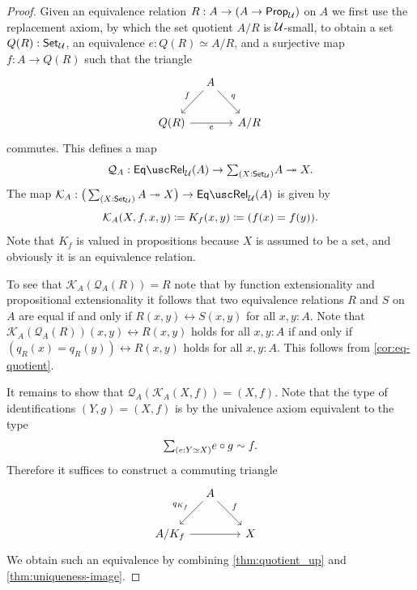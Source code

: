 \begin{proof}
  Given an equivalence relation $R:A\to(A\to\mathsf{Prop}_{\mathcal{U}})$ on $A$ we first use the replacement axiom, by which the set quotient $A/R$ is $\mathcal{U}$-small, to obtain a set $Q(R):\mathsf{Set}_{\mathcal{U}}$, an equivalence $e:Q(R)\simeq A/R$, and a surjective map $f:A\to Q(R)$ such that the triangle
  \begin{equation*}
    \begin{tikzcd}[column sep=1em]
      \phantom{Q(R)} & A \arrow[dl,swap,"f"] \arrow[dr,"q"] & \phantom{Q(R)}\\
      Q(R) \arrow[rr,swap,"e"] & & A/R
    \end{tikzcd}
  \end{equation*}
  commutes. This defines a map
  \begin{equation*}
    \mathcal{Q}_A:\eqrel_\UU(A)\to\sm{X:\Set_\UU}A\twoheadrightarrow X.
  \end{equation*}
  The map $\mathcal{K}_A:\big(\sm{X:\Set_\UU}A\twoheadrightarrow X\big)\to\eqrel_\UU(A)$ is given by
  \begin{equation*}
    \mathcal{K}_A(X,f,x,y)\coloneqq K_f(x,y) \coloneqq (f(x)=f(y)).
  \end{equation*}
  Note that $K_f$ is valued in propositions because $X$ is assumed to be a set, and obviously it is an equivalence relation.

  To see that $\mathcal{K}_A(\mathcal{Q}_A(R))=R$ note that by function extensionality and propositional extensionality it follows that two equivalence relations $R$ and $S$ on $A$ are equal if and only if $R(x,y)\leftrightarrow S(x,y)$ for all $x,y:A$. Note that $\mathcal{K}_A(\mathcal{Q}_A(R))(x,y)\leftrightarrow R(x,y)$ holds for all $x,y:A$ if and only if $(q_R(x)=q_R(y))\leftrightarrow R(x,y)$ holds for all $x,y:A$. This follows from \cref{cor:eq-quotient}.

  It remains to show that $\mathcal{Q}_A(\mathcal{K}_A(X,f))=(X,f)$. Note that the type of identifications $(Y,g)=(X,f)$ is by the univalence axiom equivalent to the type
  \begin{equation*}
    \sm{e:Y\simeq X}e\circ g\htpy f.
  \end{equation*}
  Therefore it suffices to construct a commuting triangle
  \begin{equation*}
    \begin{tikzcd}[column sep=1em]
      \phantom{A/K_f} & A \arrow[dl,swap,"q_{K_f}"] \arrow[dr,"f"] & \phantom{A/K_f} \\
      A/K_f \arrow[rr] & & X
    \end{tikzcd}
  \end{equation*}
  We obtain such an equivalence by combining \cref{thm:quotient_up} and \cref{thm:uniqueness-image}.
\end{proof}


